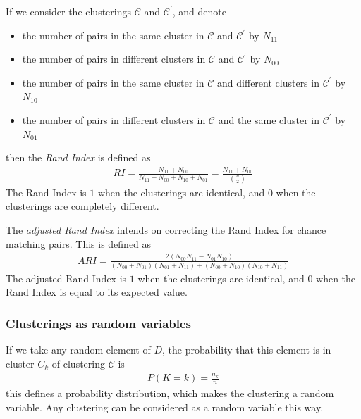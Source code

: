 \documentclass[a4paper,12pt]{article}
\theoremstyle{definition}
\begin{document}
      If we consider the clusterings $\mathcal{C}$ and $\mathcal{C}^{\prime}$, and denote
      \begin{itemize}
        \item the number of pairs in the same cluster in $\mathcal{C}$ and $\mathcal{C}^{\prime}$ by $N_{11}$
        \item the number of pairs in different clusters in $\mathcal{C}$ and $\mathcal{C}^{\prime}$ by $N_{00}$
        \item the number of pairs in the same cluster in $\mathcal{C}$ and different clusters in $\mathcal{C}^{\prime}$ by $N_{10}$
        \item the number of pairs in different clusters in $\mathcal{C}$ and the same cluster in $\mathcal{C}^{\prime}$ by $N_{01}$
      \end{itemize}
      then the \textit{Rand Index} is defined as 
      \begin{align}
          RI = \frac{N_{11} + N_{00}}{N_{11} + N_{00} + N_{10} + N_{01}} = \frac{N_{11} + N_{00}}{\binom{n}{2}}
      \end{align}
      The Rand Index is $1$ when the clusterings are identical, and $0$ when the clusterings are completely different.

      The \textit{adjusted Rand Index} intends on correcting the Rand Index for chance matching pairs. This is defined as 
      \begin{align}
          ARI = \frac{2\left( N_{00}N_{11} - N_{01}N_{10} \right)}{\left( N_{00} + N_{01} \right)\left( N_{01} + N_{11} \right) + \left( N_{00} + N_{10} \right)\left( N_{10} + N_{11} \right)}
      \end{align}
      The adjusted Rand Index is $1$ when the clusterings are identical, and $0$ when the Rand Index is equal to its expected value.

      \subsubsection{Clusterings as random variables}
      If we take any random element of $D$, the probability that this element is in cluster $C_k$ of clustering $\mathcal{C}$ is 
      \begin{align}
          P(K=k) = \frac{n_k}{n}
      \end{align}
      this defines a probability distribution, which makes the clustering a random variable. Any clustering can be considered as a random variable this way. 
\end{document}
